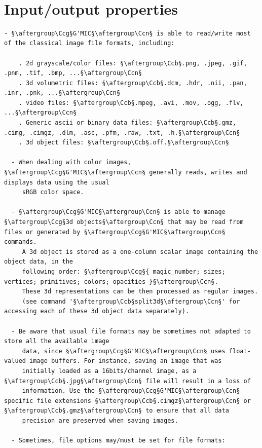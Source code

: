 \documentclass[a4paper,10.5pt,twoside]{book}
\def\Ccb{\color{cb}}
\def\Ccg{\color{cc}}
\def\Ccn{\color{black}}
\begin{document}
\normalsize
~\\\section{Input/output properties}
\small
\begin{lstlisting}[escapechar=§]
  - §\aftergroup\Ccg§G'MIC§\aftergroup\Ccn§ is able to read/write most of the classical image file formats, including: 
 
    . 2d grayscale/color files: §\aftergroup\Ccb§.png, .jpeg, .gif, .pnm, .tif, .bmp, ...§\aftergroup\Ccn§ 
    . 3d volumetric files: §\aftergroup\Ccb§.dcm, .hdr, .nii, .pan, .inr, .pnk, ...§\aftergroup\Ccn§ 
    . video files: §\aftergroup\Ccb§.mpeg, .avi, .mov, .ogg, .flv, ...§\aftergroup\Ccn§ 
    . Generic ascii or binary data files: §\aftergroup\Ccb§.gmz, .cimg, .cimgz, .dlm, .asc, .pfm, .raw, .txt, .h.§\aftergroup\Ccn§ 
    . 3d object files: §\aftergroup\Ccb§.off.§\aftergroup\Ccn§ 
 
  - When dealing with color images, §\aftergroup\Ccg§G'MIC§\aftergroup\Ccn§ generally reads, writes and displays data using the usual 
     sRGB color space. 
 
  - §\aftergroup\Ccg§G'MIC§\aftergroup\Ccn§ is able to manage §\aftergroup\Ccg§3d objects§\aftergroup\Ccn§ that may be read from files or generated by §\aftergroup\Ccg§G'MIC§\aftergroup\Ccn§ commands. 
     A 3d object is stored as a one-column scalar image containing the object data, in the 
     following order: §\aftergroup\Ccg§{ magic_number; sizes; vertices; primitives; colors; opacities }§\aftergroup\Ccn§. 
     These 3d representations can be then processed as regular images. 
     (see command '§\aftergroup\Ccb§split3d§\aftergroup\Ccn§' for accessing each of these 3d object data separately). 
 
  - Be aware that usual file formats may be sometimes not adapted to store all the available image 
     data, since §\aftergroup\Ccg§G'MIC§\aftergroup\Ccn§ uses float-valued image buffers. For instance, saving an image that was 
     initially loaded as a 16bits/channel image, as a §\aftergroup\Ccb§.jpg§\aftergroup\Ccn§ file will result in a loss of 
     information. Use the §\aftergroup\Ccg§G'MIC§\aftergroup\Ccn§-specific file extensions §\aftergroup\Ccb§.cimgz§\aftergroup\Ccn§ or §\aftergroup\Ccb§.gmz§\aftergroup\Ccn§ to ensure that all data 
     precision are preserved when saving images. 
 
  - Sometimes, file options may/must be set for file formats: 
 

\end{lstlisting}
\end{document}
